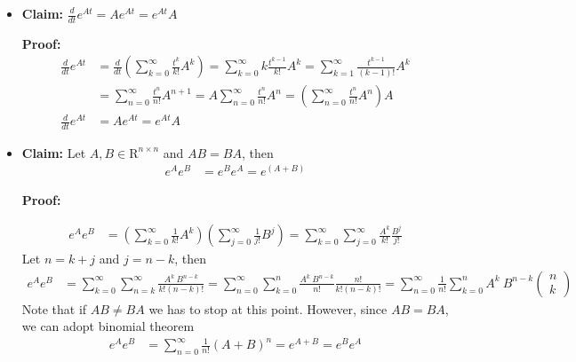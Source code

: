 \documentclass[twoside]{article}
\begin{document}
\begin{itemize}

 \item \textbf{Claim:} $ \frac{d}{d t} e^{A t} = A e^{A t} = e^{A t} A$

\textbf{Proof:} 
%
\begin{align*}
 	\frac{d}{dt} e^{A t} &= \frac{d}{dt} \left( \sum\limits_{k=0}^{\infty} \frac{t^{k}}{k!} A^k \right) =
	\sum\limits_{k=0}^{\infty} k \frac{t^{k-1}}{k!} A^k = \sum\limits_{k=1}^{\infty} \frac{t^{k-1}}{(k-1)!} A^k \\
	&= \sum\limits_{n=0}^{\infty} \frac{t^{n}}{n!} A^{n+1} = A \sum\limits_{n=0}^{\infty} \frac{t^{n}}{n!} A^{n}   = \left( \sum\limits_{n=0}^{\infty} \frac{t^{n}}{n!} A^{n} \right) A
	\\
	\frac{d}{dt} e^{A t}  &= A e^{A t} = e^{A t} A
\end{align*}

\item \textbf{Claim:} Let $A , B \in \mathrm{R}^{n \times n}$ and $A B
  = B A$, then 
%
\begin{align*}
	e^{A} e^{B} &= e^{B} e^{A} = e^{(A + B)} 
\end{align*}

\textbf{Proof:} 

\begin{align*}
	e^{A} e^{B} &= \left(\sum\limits_{k=0}^{\infty} \frac{1}{k!} A^k \right) \left(\sum\limits_{j=0}^{\infty} \frac{1}{j!} B^j \right) 
	= \sum\limits_{k=0}^{\infty} \sum\limits_{j=0}^{\infty} \frac{A^k}{k!} \frac{B^j}{j!} 
\end{align*}
%
Let $n = k + j$ and $j = n - k$, then
%
\begin{align*}
	e^{A} e^{B} &= \sum\limits_{k=0}^{\infty} \sum\limits_{n=k}^{\infty} \frac{A^k \ B^{n-k}}{k! (n-k)!} 
	= \sum\limits_{n=0}^{\infty} \sum\limits_{k=0}^{n} \frac{A^k \ B^{n-k}}{n!} \frac{n!}{k! (n-k)!}  
    = \sum\limits_{n=0}^{\infty} \frac{1}{n!} \sum\limits_{k=0}^{n} A^k \ B^{n-k}
    \left( \begin{array}{c} n \\ k \end{array} \right) 
\end{align*}
%
Note that if $A B \neq B A$ we has to stop at this point. However, since $A B = B A$, we can adopt binomial theorem 
%
\begin{align*}
	e^{A} e^{B} &= \sum\limits_{n=0}^{\infty} \frac{1}{n!} (A+B)^{n} = e^{A+B} = e^{B} e^{A}
\end{align*}


\end{itemize}
\end{document}
